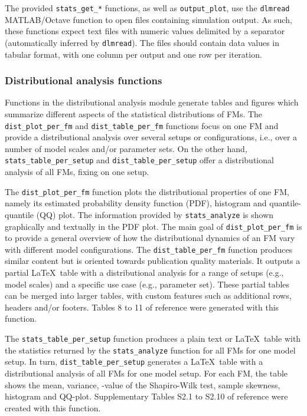 \documentclass{article}
\newcommand{\progfunc}{\textnhtt}
\begin{document}
The provided \progfunc{stats\_get\_*} functions, as well as \progfunc{output\_plot}, use the \progfunc{dlmread} MATLAB/Octave function to open files containing simulation output. As such, these functions expect text files with numeric values delimited by a separator (automatically inferred by \progfunc{dlmread}). The files should contain data values in tabular format, with one column per output and one row per iteration.

\subsubsection*{Distributional analysis functions}

Functions in the distributional analysis module generate tables and figures which summarize different aspects of the statistical distributions of FMs. The  \progfunc{dist\_plot\_per\_fm} and \progfunc{dist\_table\_per\_fm} functions focus on one FM and provide a distributional analysis over several setups or configurations, i.e., over a number of model scales and/or parameter sets. On the other hand, \progfunc{stats\_table\_per\_setup} and \progfunc{dist\_table\_per\_setup} offer a distributional analysis of all FMs, fixing on one setup.

The \progfunc{dist\_plot\_per\_fm} function plots the distributional properties of one FM, namely its estimated probability density function (PDF), histogram and quantile-quantile (QQ) plot. The information provided by \progfunc{stats\_analyze} is shown graphically and textually in the PDF plot. The main goal of \progfunc{dist\_plot\_per\_fm} is to provide a general overview of how the distributional dynamics of an FM vary with different model configurations. The \progfunc{dist\_table\_per\_fm} function produces similar content but is oriented towards publication quality materials. It outputs a partial \LaTeX\ table with a distributional analysis for a range of setups (e.g., model scales) and a specific use case (e.g., parameter set). These partial tables can be merged into larger tables, with custom features such as additional rows, headers and/or footers. Tables 8 to 11 of reference \cite{fachada2015template} were generated with this function.

The \progfunc{stats\_table\_per\_setup} function produces a plain text or \LaTeX\ table with the statistics returned by the \progfunc{stats\_analyze} function for all FMs for one model setup. In turn, \progfunc{dist\_table\_per\_setup} generates a \LaTeX\ table with a distributional analysis of all FMs for one model setup. For each FM, the table shows the mean, variance, -value of the Shapiro-Wilk test, sample skewness, histogram and QQ-plot. Supplementary Tables S2.1 to S2.10 of reference \cite{fachada2015template} were created with this function.
\end{document}

